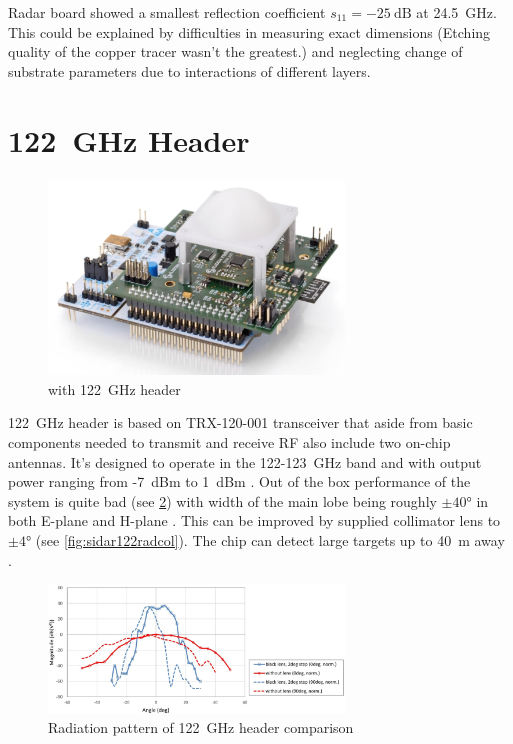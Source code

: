 Radar board showed a smallest reflection coefficient $s_{11} = -25\mathrm{~dB}$ at 24.5~GHz.
This could be explained by difficulties in measuring exact dimensions (Etching quality of the copper tracer wasn't the greatest.) and neglecting change of substrate parameters due to interactions of different layers.

\section{122~GHz Header}

\begin{figure}[h!]
	\centering
	\includegraphics[width=0.7\textwidth]{../img/sidar122.png}
	\caption[\sidar with 122~GHz header \cite{sidarPRO}]{\sidar with 122~GHz header}
	\label{fig:sidar122}
\end{figure}

122~GHz header is based on TRX-120-001 transceiver that aside from basic components needed to transmit and receive RF also include two on-chip antennas.
It's designed to operate in the 122-123~GHz band and with output power ranging from -7~dBm to 1~dBm \cite{sidarTRX122}.
Out of the box performance of the system is quite bad (see \ref{fig:sidar122rad}) with width of the main lobe being roughly $\pm40\text{°}$ in both E-plane and H-plane \cite{sidarTRX122}.
This can be improved by supplied collimator lens to $\pm4\text{°}$ \cite{sidarTRX122col} (see \ref{fig:sidar122radcol}).
The chip can detect large targets up to 40~m away \cite{sidarMANOld}.


\begin{figure}[h!]
	\centering
	\includegraphics[width=0.7\textwidth]{../img/sidar122rad.jpg}
	\caption[Radiation pattern of 122~GHz header comparison \cite{sidarTRX122col}]{Radiation pattern of 122~GHz header comparison}
	\label{fig:sidar122rad}
\end{figure}


